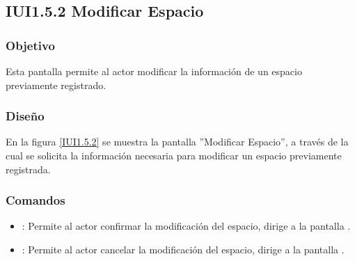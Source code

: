 \subsection{IUI1.5.2 Modificar Espacio}

\subsubsection{Objetivo}
	Esta pantalla permite al actor modificar la información de un espacio previamente registrado.

\subsubsection{Diseño}

	En la figura \ref{IUI1.5.2} se muestra la pantalla ''Modificar Espacio'', a través de la cual se solicita la información necesaria para modificar un espacio previamente registrada.


\subsubsection{Comandos}
\begin{itemize}
	\item {}: Permite al actor confirmar la modificación del espacio, dirige a la pantalla .
	
	\item {}: Permite al actor cancelar la modificación del espacio, dirige a la pantalla .
\end{itemize}
